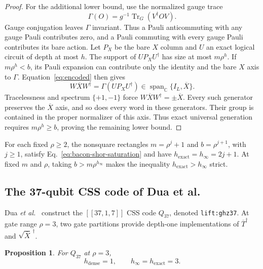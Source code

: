 \documentclass[aps,prl,reprint,notitlepage,nofootinbib,nobibnotes]{revtex4-2}
\newtheorem{proposition}{Proposition}
\newcommand{\id}{I}
\begin{document}
\begin{proof}
For the additional lower bound, use the normalized gauge trace
\begin{equation}\label{eq:gauge-trace}
 \Gamma(O)=g^{-1}\operatorname{Tr}_G(V^\dagger OV).
\end{equation}
Gauge conjugation leaves \(\Gamma\) invariant. Thus a Pauli anticommuting with any gauge Pauli contributes zero, and a Pauli commuting with every gauge Pauli contributes its bare action. Let \(P_X\) be the bare \(X\) column and \(U\) an exact logical circuit of depth at most \(h\). The support of \(UP_XU^\dagger\) has size at most \(m\rho^h\). If \(m\rho^h<b\), its Pauli expansion can contribute only the identity and the bare \(X\) axis to \(\Gamma\). Equation~\eqref{eq:encoded} then gives
\[
 W\overline X W^\dagger
 =\Gamma(UP_XU^\dagger)\in
 \operatorname{span}_{\mathbb C}\{\id_L,\overline X\}.
\]
Tracelessness and spectrum \(\{+1,-1\}\) force \(W\overline XW^\dagger=\pm\overline X\). Every such generator preserves the \(\overline X\) axis, and so does every word in these generators. Their group is contained in the proper normalizer of this axis. Thus exact universal generation requires \(m\rho^h\ge b\), proving the remaining lower bound.
\end{proof}

For each fixed \(\rho\ge2\), the nonsquare rectangles \(m=\rho^j+1\) and \(b=\rho^{j+1}\), with \(j\ge1\), satisfy Eq.~\eqref{eq:bacon-shor-saturation} and have \(h_{\mathrm{exact}}=h_\infty=2j+1\). At fixed \(m\) and \(\rho\), taking \(b>m\rho^{h_\infty}\) makes the inequality \(h_{\mathrm{exact}}>h_\infty\) strict.

\subsection*{The 37-qubit CSS code of Dua et al.}

Dua \emph{et al.}~\cite[Sec.~V and App.~B]{Dua} construct the \([[37,1,7]]\) CSS code \(Q_{37}\), denoted \texttt{lift:ghz37}. At gate range \(\rho=3\), two gate partitions provide depth-one implementations of \(\overline T^\dagger\) and \(\sqrt{\overline X}^{\,\dagger}\).

\begin{proposition}\label{prop:dua-example}
For \(Q_{37}\) at \(\rho=3\),
\begin{equation}\label{eq:dua-thresholds}
 h_{\mathrm{dense}}=1,\qquad h_\infty=h_{\mathrm{exact}}=3.
\end{equation}
\end{proposition}
\end{document}
